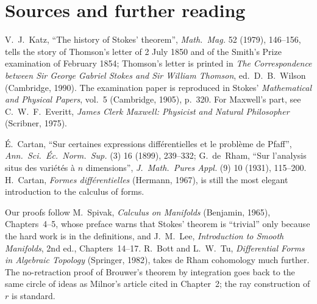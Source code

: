 \section*{Sources and further reading}

V.~J.~Katz, ``The history of Stokes' theorem'', \emph{Math.\ Mag.} 52 (1979), 146--156, tells the story of Thomson's letter of 2 July 1850 and of the Smith's
Prize examination of February 1854; Thomson's letter is printed in \emph{The Correspondence between Sir George Gabriel Stokes and Sir William Thomson},
ed.\ D.~B.~Wilson (Cambridge, 1990). The examination paper is reproduced in Stokes' \emph{Mathematical and Physical Papers}, vol.~5 (Cambridge, 1905),
p.~320. For Maxwell's part, see C.~W.~F.~Everitt, \emph{James Clerk Maxwell: Physicist and Natural Philosopher} (Scribner, 1975).

\'E.~Cartan, ``Sur certaines expressions diff\'erentielles et le probl\`eme de Pfaff'', \emph{Ann.\ Sci.\ \'Ec.\ Norm.\ Sup.} (3) 16 (1899), 239--332;
G.~de~Rham, ``Sur l'analysis situs des vari\'et\'es \`a $n$ dimensions'', \emph{J.\ Math.\ Pures Appl.} (9) 10 (1931), 115--200. H.~Cartan,
\emph{Formes diff\'erentielles} (Hermann, 1967), is still the most elegant introduction to the calculus of forms.

Our proofs follow M.~Spivak, \emph{Calculus on Manifolds} (Benjamin, 1965), Chapters~4--5, whose preface warns that Stokes' theorem is ``trivial'' only
because the hard work is in the definitions, and J.~M.~Lee, \emph{Introduction to Smooth Manifolds}, 2nd ed., Chapters~14--17. R.~Bott and L.~W.~Tu,
\emph{Differential Forms in Algebraic Topology} (Springer, 1982), takes de Rham cohomology much further. The no-retraction proof of Brouwer's theorem by
integration goes back to the same circle of ideas as Milnor's article cited in Chapter~2; the ray construction of $r$ is standard.
